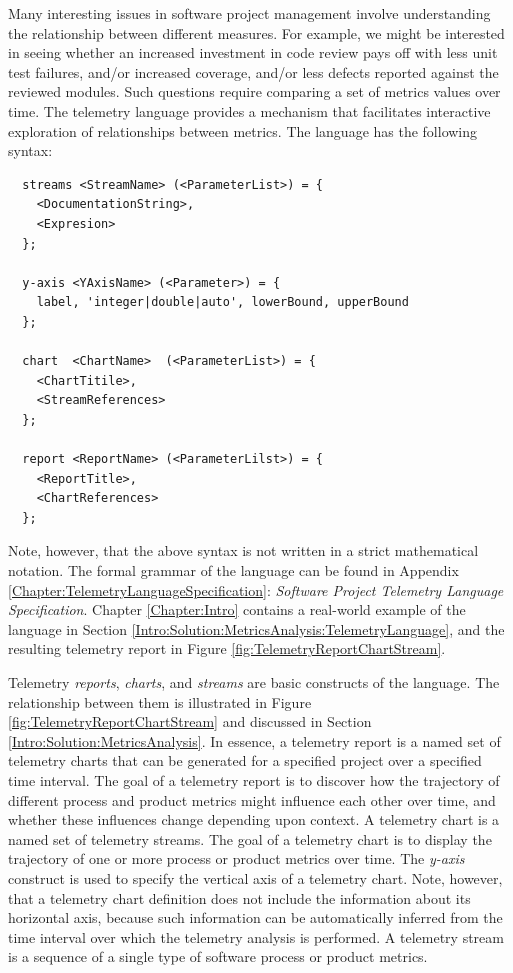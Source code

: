 Many interesting issues in software project management involve understanding the relationship between different measures. For example, we might be interested in seeing whether an increased investment in code review pays off with less unit test failures, and/or increased coverage, and/or less defects reported against the reviewed modules. Such questions require comparing a set of metrics values over time. The telemetry language provides a mechanism that facilitates interactive exploration of relationships between metrics.
The language has the following syntax:

\begin{verbatim}
  streams <StreamName> (<ParameterList>) = {
    <DocumentationString>, 
    <Expresion>
  };
    
  y-axis <YAxisName> (<Parameter>) = {
    label, 'integer|double|auto', lowerBound, upperBound
  };
  
  chart  <ChartName>  (<ParameterList>) = {
    <ChartTitile>, 
    <StreamReferences>
  };
    
  report <ReportName> (<ParameterLilst>) = {
    <ReportTitle>, 
    <ChartReferences>
  };
\end{verbatim}


Note, however, that the above syntax is not written in a strict mathematical notation. The formal grammar of the language can be found in Appendix \ref{Chapter:TelemetryLanguageSpecification}: \textit{Software Project Telemetry Language Specification}. 
Chapter \ref{Chapter:Intro} contains a real-world example of the language in Section \ref{Intro:Solution:MetricsAnalysis:TelemetryLanguage}, and the resulting telemetry report in Figure \ref{fig:TelemetryReportChartStream}.


Telemetry \textit{reports}, \textit{charts}, and \textit{streams} are basic constructs of the language. The relationship between them is illustrated in Figure \ref{fig:TelemetryReportChartStream} and discussed in Section \ref{Intro:Solution:MetricsAnalysis}. 
In essence, a telemetry report is a named set of telemetry charts that can be generated for a specified project over a specified time interval. The goal of a telemetry report is to discover how the trajectory of different process and product metrics might influence each other over time, and whether these influences change depending upon context.
A telemetry chart is a named set of telemetry streams. The goal of a telemetry chart is to display the trajectory of one or more process or product metrics over time. The \textit{y-axis} construct is used to specify the vertical axis of a telemetry chart. Note, however, that a telemetry chart definition does not include the information about its horizontal axis, because such information can be automatically inferred from the time interval over which the telemetry analysis is performed. 
A telemetry stream is a sequence of a single type of software process or product metrics. 
 
